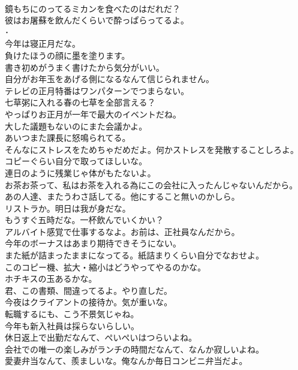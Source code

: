 \documentclass[8pt]{extreport}
\begin{document}
\begin{CJK}{UTF8}{min}
\\	鏡もちにのってるミカンを食べたのはだれだ？	
\\	彼はお屠蘇を飲んだくらいで酔っぱらってるよ。	
\\	･ 
\\	今年は寝正月だな。	
\\	負けたほうの顔に墨を塗ります。	
\\	書き初めがうまく書けたから気分がいい。	
\\	自分がお年玉をあげる側になるなんて信じられません。	
\\	テレビの正月特番はワンパターンでつまらない。	
\\	七草粥に入れる春の七草を全部言える？	
\\	やっぱりお正月が一年で最大のイベントだね。	
\\	大した議題もないのにまた会議かよ。	
\\	あいつまた課長に怒鳴られてる。	
\\	そんなにストレスをためちゃだめだよ。何かストレスを発散することしろよ。	
\\	コピーぐらい自分で取ってほしいな。	
\\	連日のように残業じゃ体がもたないよ。	
\\	お茶お茶って、私はお茶を入れる為にこの会社に入ったんじゃないんだから。	
\\	あの人達、またうわさ話してる。他にすること無いのかしら。	
\\	リストラか。明日は我が身だな。	
\\	もうすぐ五時だな。一杯飲んでいくかい？	
\\	アルバイト感覚で仕事するなよ。お前は、正社員なんだから。	
\\	今年のボーナスはあまり期待できそうにない。	
\\	また紙が詰まったままになってる。紙詰まりくらい自分でなおせよ。	
\\	このコピー機、拡大・縮小はどうやってやるのかな。	
\\	ホチキスの玉あるかな。	
\\	君、この書類、間違ってるよ。やり直しだ。	
\\	今夜はクライアントの接待か。気が重いな。	
\\	転職するにも、こう不景気じゃね。	
\\	今年も新入社員は採らないらしい。	
\\	休日返上で出勤だなんて、ぺいぺいはつらいよね。	
\\	会社での唯一の楽しみがランチの時間だなんて、なんか寂しいよね。	
\\	愛妻弁当なんて、羨ましいな。俺なんか毎日コンビニ弁当だよ。	

\end{CJK}
\end{document}
